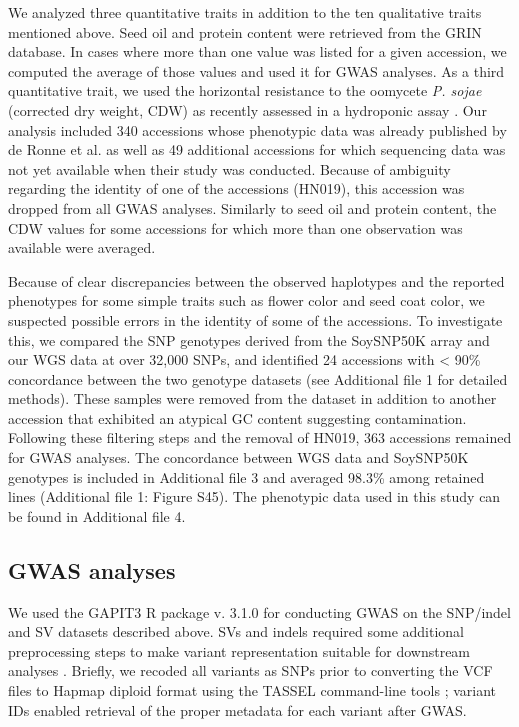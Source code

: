 \documentclass[doublespacing]{bmcart}
\begin{document}
We analyzed three quantitative traits in addition to the ten qualitative traits
mentioned above. Seed oil and protein content were retrieved from the GRIN
database. In cases where more than one value was listed for a given accession,
we computed the average of those values and used it for GWAS analyses. As a third quantitative trait, we
used the horizontal resistance to the oomycete \textit{P. sojae} (corrected dry
weight, CDW) as recently assessed in a hydroponic assay \citep{deronne2022}.
Our analysis included 340 accessions whose phenotypic data
was already published by de Ronne et al. \cite{deronne2022} as well as 49 additional accessions for
which sequencing data was not yet available when their study was conducted.
Because of ambiguity regarding the identity of one of the accessions (HN019), this accession
was dropped from all GWAS analyses. Similarly to seed oil and
protein content, the CDW values for some accessions for which more than one
observation was available were averaged.

Because of clear discrepancies between the observed haplotypes and the reported
phenotypes for some simple traits such as flower color and seed coat color, we
suspected possible errors in the identity of some of the accessions. To
investigate this, we compared the SNP genotypes derived from the SoySNP50K
array and our WGS data at over 32,000 SNPs, and identified 24 accessions with <
90\% concordance between the two genotype datasets (see Additional file 1 for
detailed methods). These samples were removed from the dataset in addition to another
accession that exhibited an atypical GC content suggesting contamination.
Following these filtering steps and the removal of HN019, 363 accessions
remained for GWAS analyses. The concordance between WGS data and SoySNP50K
genotypes is included in Additional file 3 and averaged 98.3\% among retained
lines (Additional file 1: Figure S45). The phenotypic data used in this study can be found in Additional file 4.

\subsection*{GWAS analyses}

We used the GAPIT3 R package v. 3.1.0 \citep{wang2021} for conducting GWAS on
the SNP/indel and SV datasets described above. SVs and indels required some additional
preprocessing steps to make variant
representation suitable for downstream analyses \citep{lemay2022gwas}. Briefly, we recoded all
variants as SNPs prior to converting the VCF files to Hapmap diploid format
using the TASSEL command-line tools \citep{bradbury2007}; variant IDs enabled
retrieval of the proper metadata for each variant after GWAS.
\end{document}
